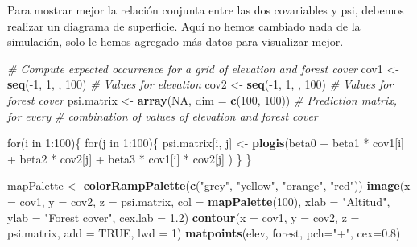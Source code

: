 \documentclass[]{book}
\newenvironment{Shaded}{\begin{snugshade}}{\end{snugshade}}
\newcommand{\KeywordTok}[1]{\textcolor[rgb]{0.13,0.29,0.53}{\textbf{{#1}}}}
\newcommand{\DataTypeTok}[1]{\textcolor[rgb]{0.13,0.29,0.53}{{#1}}}
\newcommand{\DecValTok}[1]{\textcolor[rgb]{0.00,0.00,0.81}{{#1}}}
\newcommand{\FloatTok}[1]{\textcolor[rgb]{0.00,0.00,0.81}{{#1}}}
\newcommand{\StringTok}[1]{\textcolor[rgb]{0.31,0.60,0.02}{{#1}}}
\newcommand{\CommentTok}[1]{\textcolor[rgb]{0.56,0.35,0.01}{\textit{{#1}}}}
\newcommand{\OtherTok}[1]{\textcolor[rgb]{0.56,0.35,0.01}{{#1}}}
\newcommand{\NormalTok}[1]{{#1}}
\begin{document}
Para mostrar mejor la relación conjunta entre las dos covariables y psi,
debemos realizar un diagrama de superficie. Aquí no hemos cambiado nada
de la simulación, solo le hemos agregado más datos para visualizar
mejor.

\begin{Shaded}
\begin{Highlighting}[]
\CommentTok{# Compute expected occurrence for a grid of elevation and forest cover}
\NormalTok{cov1 <-}\StringTok{ }\KeywordTok{seq}\NormalTok{(-}\DecValTok{1}\NormalTok{, }\DecValTok{1}\NormalTok{, , }\DecValTok{100}\NormalTok{)                       }\CommentTok{# Values for elevation}
\NormalTok{cov2 <-}\StringTok{ }\KeywordTok{seq}\NormalTok{(-}\DecValTok{1}\NormalTok{, }\DecValTok{1}\NormalTok{, , }\DecValTok{100}\NormalTok{)                       }\CommentTok{# Values for forest cover}
\NormalTok{psi.matrix <-}\StringTok{ }\KeywordTok{array}\NormalTok{(}\OtherTok{NA}\NormalTok{, }\DataTypeTok{dim =} \KeywordTok{c}\NormalTok{(}\DecValTok{100}\NormalTok{, }\DecValTok{100}\NormalTok{))      }\CommentTok{# Prediction matrix, for every }
\CommentTok{# combination of values of elevation and forest cover}

\NormalTok{for(i in }\DecValTok{1}\NormalTok{:}\DecValTok{100}\NormalTok{)\{}
   \NormalTok{for(j in }\DecValTok{1}\NormalTok{:}\DecValTok{100}\NormalTok{)\{}
      \NormalTok{psi.matrix[i, j] <-}\StringTok{ }\KeywordTok{plogis}\NormalTok{(beta0 +}\StringTok{ }
\StringTok{                                   }\NormalTok{beta1 *}\StringTok{ }\NormalTok{cov1[i] +}\StringTok{ }
\StringTok{                                   }\NormalTok{beta2 *}\StringTok{ }\NormalTok{cov2[j] +}\StringTok{ }
\StringTok{                                   }\NormalTok{beta3 *}\StringTok{ }\NormalTok{cov1[i] *}\StringTok{ }\NormalTok{cov2[j] )}
   \NormalTok{\}}
\NormalTok{\}}

\NormalTok{mapPalette <-}\StringTok{ }\KeywordTok{colorRampPalette}\NormalTok{(}\KeywordTok{c}\NormalTok{(}\StringTok{"grey"}\NormalTok{, }\StringTok{"yellow"}\NormalTok{, }\StringTok{"orange"}\NormalTok{, }\StringTok{"red"}\NormalTok{))}
\KeywordTok{image}\NormalTok{(}\DataTypeTok{x =} \NormalTok{cov1, }\DataTypeTok{y =} \NormalTok{cov2, }\DataTypeTok{z =} \NormalTok{psi.matrix, }\DataTypeTok{col =} \KeywordTok{mapPalette}\NormalTok{(}\DecValTok{100}\NormalTok{), }\DataTypeTok{xlab =} \StringTok{"Altitud"}\NormalTok{, }
      \DataTypeTok{ylab =} \StringTok{"Forest cover"}\NormalTok{, }\DataTypeTok{cex.lab =} \FloatTok{1.2}\NormalTok{)}
\KeywordTok{contour}\NormalTok{(}\DataTypeTok{x =} \NormalTok{cov1, }\DataTypeTok{y =} \NormalTok{cov2, }\DataTypeTok{z =} \NormalTok{psi.matrix, }\DataTypeTok{add =} \OtherTok{TRUE}\NormalTok{, }\DataTypeTok{lwd =} \DecValTok{1}\NormalTok{)}
\KeywordTok{matpoints}\NormalTok{(elev, forest, }\DataTypeTok{pch=}\StringTok{"+"}\NormalTok{, }\DataTypeTok{cex=}\FloatTok{0.8}\NormalTok{)}
\end{Highlighting}
\end{Shaded}
\end{document}
